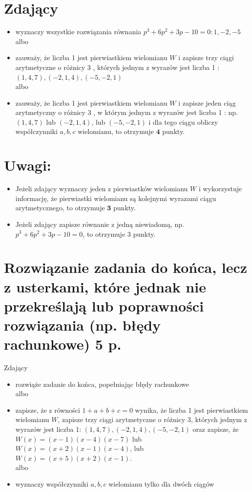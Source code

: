 \documentclass[10pt]{article}
\begin{document}
\section*{Zdający}
\begin{itemize}
  \item wyznaczy wszystkie rozwiązania równania $p^{3}+6 p^{2}+3 p-10=0: 1,-2,-5$\\
albo
  \item zauważy, że liczba 1 jest pierwiastkiem wielomianu $W$ i zapisze trzy ciągi arytmetyczne o różnicy 3 , których jednym z wyrazów jest liczba 1 :\\
$(1,4,7),(-2,1,4),(-5,-2,1)$\\
albo
  \item zauważy, że liczba 1 jest pierwiastkiem wielomianu $W$ i zapisze jeden ciąg arytmetyczny o różnicy 3 , w którym jednym z wyrazów jest liczba 1 : np. $(1,4,7)$ lub $(-2,1,4)$, lub $(-5,-2,1)$ i dla tego ciągu obliczy współczynniki $a, b, c$ wielomianu, to otrzymuje $\mathbf{4}$ punkty.
\end{itemize}

\section*{Uwagi:}
\begin{itemize}
  \item Jeżeli zdający wyznaczy jeden z pierwiastków wielomianu $W$ i wykorzystuje informację, że pierwiastki wielomianu są kolejnymi wyrazami ciągu arytmetycznego, to otrzymuje $\mathbf{3}$ punkty.
  \item Jeżeli zdający zapisze równanie z jedną niewiadomą, np. $p^{3}+6 p^{2}+3 p-10=0$, to otrzymuje 3 punkty.
\end{itemize}

\section*{Rozwiązanie zadania do końca, lecz z usterkami, które jednak nie przekreślają lub poprawności rozwiązania (np. błędy rachunkowe) 5 p.}
Zdający

\begin{itemize}
  \item rozwiąże zadanie do końca, popełniając błędy rachunkowe\\
albo
  \item zapisze, że z równości $1+a+b+c=0$ wynika, że liczba 1 jest pierwiastkiem wielomianu $W$, zapisze trzy ciągi arytmetyczne o różnicy 3, których jednym z wyrazów jest liczba 1: $(1,4,7),(-2,1,4),(-5,-2,1)$ oraz zapisze, że $W(x)=(x-1)(x-4)(x-7)$ lub $W(x)=(x+2)(x-1)(x-4)$, lub $W(x)=(x+5)(x+2)(x-1)$.\\
albo
  \item wyznaczy współczynniki $a, b, c$ wielomianu tylko dla dwóch ciągów
\end{itemize}
\end{document}
